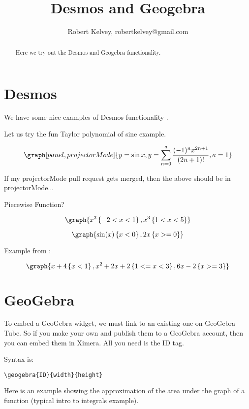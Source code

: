 \documentclass{ximera}
\title{Desmos and Geogebra}
\author{Robert Kelvey, robertkelvey@gmail.com}
\begin{document}
\begin{abstract}
Here we try out the Desmos and Geogebra functionality.
\end{abstract}
\maketitle

\section{Desmos}

We have some nice examples of Desmos functionality . 

Let us try the fun Taylor polynomial of sine example.

\[
    \graph[panel, projectorMode]{y=\sin x, y=\sum _{n=0}^a\frac{(-1)^n x^{2n+1}}{(2n+1)!}, a=1}
\]

If my projectorMode pull request gets merged, then the above should be in projectorMode...


Piecewise Function?

\[
    \graph{ x^2\left\{-2 < x < 1 \right\}, x^3 \left\{1<x<5\right\}}
\]

\[
    \graph{ \sin(x)\left\{x<0\right\}, 2x\left\{ x>=0 \right\} }
\]

Example from :

\[
       \graph{ x+4\left\{x<1\right\}, x^2+2x+2\left\{1<= x < 3\right\}, 6x-2\left\{x>=3\right\} }
\]


\section{GeoGebra}

To embed a GeoGebra widget, we must link to an existing one on GeoGebra Tube. So if you make your own and publish them to a GeoGebra account, then you can embed them in Ximera. All you need is the ID tag.

Syntax is: \begin{verbatim}\geogebra{ID}{width}{height} \end{verbatim}

Here is an example showing the approximation of the area under the graph of a function (typical intro to integrals example).

\end{document}
